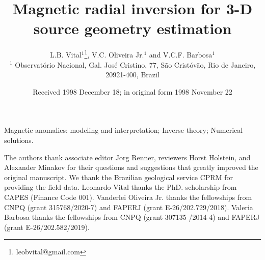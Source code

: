 \documentclass[extra,mreferee]{gji}
\title[Geophys.\ J.\ Int.: Magnetic radial inversion]
  {Magnetic radial inversion for 3-D source geometry estimation}
\author[L.B. Vital, V.C. Oliveira Jr. and V.C.F. Barbosa]
  {L.B. Vital$^1$\thanks{leobvital@gmail.com}, 
  V.C. Oliveira Jr.$^1$ and V.C.F. Barbosa$^1$\\
  $^1$ Observat{\'o}rio Nacional, Gal. Jos{\'e} Cristino, 77, São Crist{\'o}v{\~a}o,
  Rio de Janeiro, 20921-400, Brazil
  }
\date{Received 1998 December 18; in original form 1998 November 22}
\begin{document}
\label{firstpage}

\maketitle



\begin{keywords}
 Magnetic anomalies: modeling and interpretation; Inverse theory; Numerical solutions.
\end{keywords}











\begin{acknowledgments}
The authors thank associate editor Jorg Renner, reviewers Horst Holstein, and Alexander Minakov 
for their questions and suggestions that greatly improved the original manuscript.	
We thank the Brazilian geological service CPRM for providing the field data. 
Leonardo Vital thanks the PhD. scholarship from CAPES (Finance Code 001). 
Vanderlei Oliveira Jr. thanks the fellowships from CNPQ (grant 315768/2020-7) and 
FAPERJ (grant E-26/202.729/2018).  
Valeria Barbosa thanks the fellowships from CNPQ (grant 307135 /2014-4) and 
FAPERJ (grant E-26/202.582/2019).
\end{acknowledgments}






\appendix

\label{lastpage}
\end{document}
